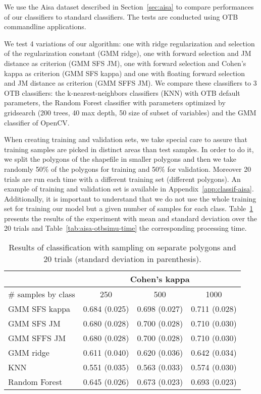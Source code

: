 \documentclass[a4paper,11pt,DIV=16,abstracton]{scrartcl}
\begin{document}
        We use the Aisa dataset described in Section~\ref{sec:aisa} to compare performances of our classifiers to standard classifiers. The tests are conducted using OTB commandline applications.

        We test 4 variations of our algorithm: one with ridge regularization and selection of the regularization constant (GMM ridge), one with forward selection and JM distance as criterion (GMM SFS JM), one with forward selection and Cohen's kappa as criterion (GMM SFS kappa) and one with floating forward selection and JM distance as criterion (GMM SFFS JM). We compare these classifiers to 3 OTB classifiers: the k-nearest-neighbors classifiers (KNN) with OTB default parameters, the Random Forest classifier with parameters optimized by gridsearch (200 trees, 40 max depth, 50 size of subset of variables) and the GMM classifier of OpenCV.

        When creating training and validation sets, we take special care to assure that training samples are picked in distinct areas than test samples. In order to do it, we split the polygons of the shapefile in smaller polygons and then we take randomly 50\% of the polygons for training and 50\% for validation. Moreover 20 trials are run each time with a different training set (different polygons). An example of training and validation set is available in Appendix~\ref{app:classif-aisa}. Additionally, it is important to understand that we do not use the whole training set for training our model but a given number of samples for each class. Table~\ref{tab:aisa-otbsimu} presents the results of the experiment with mean and standard deviation over the 20 trials and Table~\ref{tab:aisa-otbsimu-time} the corresponding processing time.

        \begin{table}[!ht]
            \centering
            \begin{tabular}{|l|c|c|c|}\hline
                 & \multicolumn{3}{c|}{\bfseries Cohen's kappa} \\ \hline
                \# samples by class & 250 & 500 & 1000 \\ \hline

                GMM SFS kappa & 0.684 (0.025) & 0.698 (0.027) & 0.711 (0.028) \\
                GMM SFS JM &    0.680 (0.028) & 0.700 (0.028) & 0.710 (0.030) \\
                GMM SFFS JM &   0.680 (0.028) & 0.700 (0.028) & 0.710 (0.030) \\
                GMM ridge &     0.611 (0.040) & 0.620 (0.036) & 0.642 (0.034) \\
                KNN &           0.551 (0.035) & 0.563 (0.033) & 0.574 (0.030) \\
                Random Forest & 0.645 (0.026) & 0.673 (0.023) & 0.693 (0.023) \\

                \hline
            \end{tabular}
            \caption{Results of classification with sampling on separate polygons and 20 trials (standard deviation in parenthesis).\label{tab:aisa-otbsimu}}
        \end{table}
\end{document}
